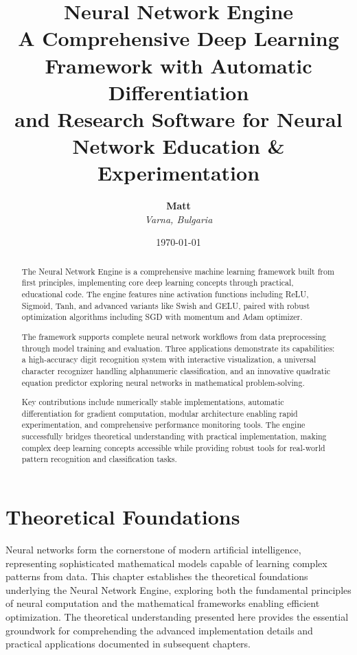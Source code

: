 \documentclass[11pt,a4paper]{report}
\title{
    \Huge\textbf{Neural Network Engine} \\
    \Large A Comprehensive Deep Learning Framework with Automatic Differentiation \\
    \large and Research Software for Neural Network Education \& Experimentation
}
\author{
    \textbf{Matt} \\
    \textit{Varna, Bulgaria}
}
\date{\today}
\begin{document}
\maketitle
\thispagestyle{empty}

\begin{abstract}
The Neural Network Engine is a comprehensive machine learning framework built from first principles, implementing core deep learning concepts through practical, educational code. The engine features nine activation functions including ReLU, Sigmoid, Tanh, and advanced variants like Swish and GELU, paired with robust optimization algorithms including SGD with momentum and Adam optimizer.

The framework supports complete neural network workflows from data preprocessing through model training and evaluation. Three applications demonstrate its capabilities: a high-accuracy digit recognition system with interactive visualization, a universal character recognizer handling alphanumeric classification, and an innovative quadratic equation predictor exploring neural networks in mathematical problem-solving.

Key contributions include numerically stable implementations, automatic differentiation for gradient computation, modular architecture enabling rapid experimentation, and comprehensive performance monitoring tools. The engine successfully bridges theoretical understanding with practical implementation, making complex deep learning concepts accessible while providing robust tools for real-world pattern recognition and classification tasks.
\end{abstract}

\tableofcontents
\newpage

\chapter{Theoretical Foundations}

Neural networks form the cornerstone of modern artificial intelligence, representing sophisticated mathematical models capable of learning complex patterns from data. This chapter establishes the theoretical foundations underlying the Neural Network Engine, exploring both the fundamental principles of neural computation and the mathematical frameworks enabling efficient optimization. The theoretical understanding presented here provides the essential groundwork for comprehending the advanced implementation details and practical applications documented in subsequent chapters.
\end{document}
